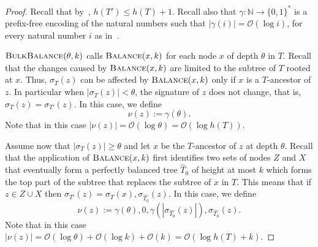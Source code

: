 \documentclass[kpfonts]{patmorin}
\newcommand{\Oh}{\mathcal{O}}
\let\leq\leqslant
\let\geq\geqslant
\begin{document}
\begin{proof}
  Recall that by~, $h(T') \leq h(T)+1$. 
  Recall also that $\gamma:\mathbb{N}\to\{0,1\}^*$ is a prefix-free encoding of the natural numbers such that $|\gamma(i)|=\Oh(\log i)$, for every natural number $i$ as in~. 

  $\textsc{BulkBalance}(\theta,k)$ calls $\textsc{Balance}(x,k)$ for each node $x$ of depth $\theta$  in $T$.
  Recall that the changes caused by $\textsc{Balance}(x,k)$ are limited to the subtree of $T$ rooted at $x$.
  Thus, $\sigma_{T}(z)$ can be affected by $\textsc{Balance}(x,k)$ only if $x$ is a $T$-ancestor of $z$.
  In particular when $|\sigma_{T}(z)| < \theta$, the signature of $z$ does not change, that is, $\sigma_{T}(z)=\sigma_{T'}(z)$. In this case,  we define
  \[
  \nu(z):=\gamma(\theta).
  \]
  Note that in this case $|\nu(z)|=\Oh(\log\theta) = \Oh(\log h(T))$.

  Assume now that $|\sigma_{T}(z)| \geq \theta$ and let $x$ be the $T$-ancestor of $z$ at depth $\theta$.
  Recall that the application of $\textsc{Balance}(x,k)$ first identifies two sets of nodes $Z$ and $X$ that eventually form a perfectly balanced tree $\hat{T}_0$ of height at most $k$ which forms the top part of the subtree that replaces the subtree of $x$ in $T$.
  This means that if $z\in Z\cup X$ then $\sigma_{T'}(z) = \sigma_{T}(x),\sigma_{\hat{T_0}}(z)$.
  In this case, we define 
  \[
  \nu(z):=\gamma(\theta),0,\gamma(|\sigma_{\hat{T_0}}(z)|),\sigma_{\hat{T_0}}(z).
  \]
  Note that in this case $|\nu(z)|=\Oh(\log\theta) + \Oh(\log k) + \Oh(k) = \Oh(\log h(T) + k)$.


\end{proof}
\end{document}
